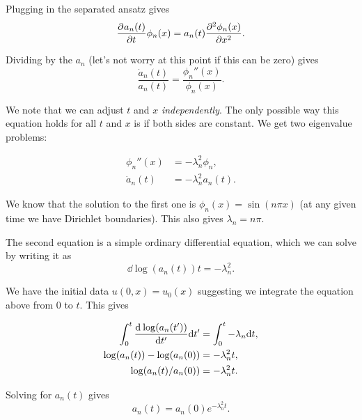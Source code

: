 \begin{frame}
	Plugging in the separated ansatz gives 
	\[ \pfrac{a_n(t)}{t} \phi_n (x) = a_n(t) \pfrac[2]{\phi_n(x)}{x}. \]
	
	\pause
	Dividing by the $ a_n $ (let's not worry at this point if this can be zero) gives
	\[ \frac{\dot{a}_{n}(t)}{a_{n}(t)} = \frac{\phi_n''(x)}{\phi_n(x)}. \]
	
	\pause
	We note that we can adjust $ t $ and $ x $ \emph{independently}. The only possible way this equation holds for all $ t $ and $ x $ is if both sides are constant. We get two eigenvalue problems:
	
	\pause
	\begin{align*}
		\phi_n''(x) &= -\lambda_n^2 \phi_n,  \\
		\dot{a}_{n}(t) &= -\lambda_n^2 a_n(t).
	\end{align*}
	
	We know that the solution to the first one is \alert{$ \phi_n(x) = \sin(n \pi x) $} (at any given time we have Dirichlet boundaries). This also gives \alert{$ \lambda_n = n \pi $}.
\end{frame}

\begin{frame}
	The second equation is a simple ordinary differential equation, which we can solve by writing it as 
	\[ \dd{\log(a_n(t))}{t} = - \lambda_n^2. \]
	
	\pause
	We have the initial data $ u(0,x) = u_0(x) $ suggesting we integrate the equation above from $ 0 $ to $ t $. This gives
	
	\pause
	\[ \begin{split}
		\int_{0}^{t}  \dd{\log(a_n(t'))}{t'} \diff t' &= \int_{0}^{t} -\lambda_n \diff t, \\
		\log(a_n(t))-\log(a_n(0)) &= -\lambda_n^2 t, \\
		\log(a_n(t)/a_n(0)) &= -\lambda_n^2 t.
	\end{split} \]
	
	\pause
	Solving for $ a_n(t) $ gives
	\begin{equation}\label{heat_coefficients}
		a_n(t) = a_n(0) e^{-\lambda_n^2 t}.
	\end{equation}
	
\end{frame}

